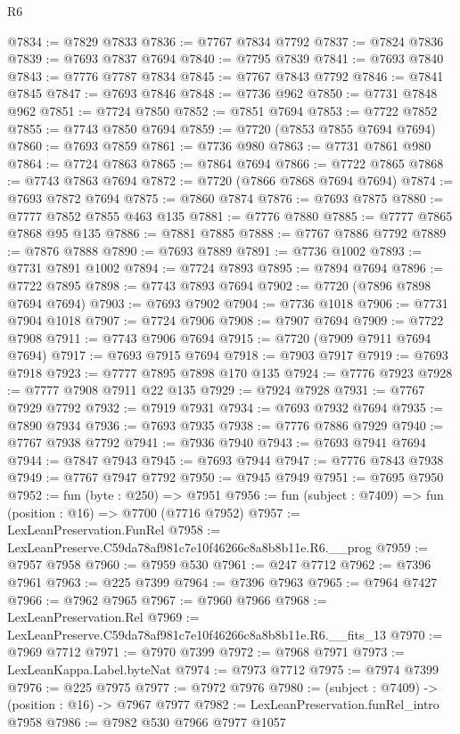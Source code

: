 \begin{lexlean}{R6}
\begin{coremodule}
@7834 := @7829 @7833
@7836 := @7767 @7834 @7792
@7837 := @7824 @7836
@7839 := @7693 @7837 @7694
@7840 := @7795 @7839
@7841 := @7693 @7840
@7843 := @7776 @7787 @7834
@7845 := @7767 @7843 @7792
@7846 := @7841 @7845
@7847 := @7693 @7846
@7848 := @7736 @962
@7850 := @7731 @7848 @962
@7851 := @7724 @7850
@7852 := @7851 @7694
@7853 := @7722 @7852
@7855 := @7743 @7850 @7694
@7859 := @7720 (@7853 @7855 @7694 @7694)
@7860 := @7693 @7859
@7861 := @7736 @980
@7863 := @7731 @7861 @980
@7864 := @7724 @7863
@7865 := @7864 @7694
@7866 := @7722 @7865
@7868 := @7743 @7863 @7694
@7872 := @7720 (@7866 @7868 @7694 @7694)
@7874 := @7693 @7872 @7694
@7875 := @7860 @7874
@7876 := @7693 @7875
@7880 := @7777 @7852 @7855 @463 @135
@7881 := @7776 @7880
@7885 := @7777 @7865 @7868 @95 @135
@7886 := @7881 @7885
@7888 := @7767 @7886 @7792
@7889 := @7876 @7888
@7890 := @7693 @7889
@7891 := @7736 @1002
@7893 := @7731 @7891 @1002
@7894 := @7724 @7893
@7895 := @7894 @7694
@7896 := @7722 @7895
@7898 := @7743 @7893 @7694
@7902 := @7720 (@7896 @7898 @7694 @7694)
@7903 := @7693 @7902
@7904 := @7736 @1018
@7906 := @7731 @7904 @1018
@7907 := @7724 @7906
@7908 := @7907 @7694
@7909 := @7722 @7908
@7911 := @7743 @7906 @7694
@7915 := @7720 (@7909 @7911 @7694 @7694)
@7917 := @7693 @7915 @7694
@7918 := @7903 @7917
@7919 := @7693 @7918
@7923 := @7777 @7895 @7898 @170 @135
@7924 := @7776 @7923
@7928 := @7777 @7908 @7911 @22 @135
@7929 := @7924 @7928
@7931 := @7767 @7929 @7792
@7932 := @7919 @7931
@7934 := @7693 @7932 @7694
@7935 := @7890 @7934
@7936 := @7693 @7935
@7938 := @7776 @7886 @7929
@7940 := @7767 @7938 @7792
@7941 := @7936 @7940
@7943 := @7693 @7941 @7694
@7944 := @7847 @7943
@7945 := @7693 @7944
@7947 := @7776 @7843 @7938
@7949 := @7767 @7947 @7792
@7950 := @7945 @7949
@7951 := @7695 @7950
@7952 := fun (byte : @250) => @7951
@7956 := fun (subject : @7409) => fun (position : @16) => @7700 (@7716 @7952)
@7957 := LexLeanPreservation.FunRel
@7958 := LexLeanPreserve.C59da78af981c7e10f46266c8a8b8b11e.R6.__prog
@7959 := @7957 @7958
@7960 := @7959 @530
@7961 := @247 @7712
@7962 := @7396 @7961
@7963 := @225 @7399
@7964 := @7396 @7963
@7965 := @7964 @7427
@7966 := @7962 @7965
@7967 := @7960 @7966
@7968 := LexLeanPreservation.Rel
@7969 := LexLeanPreserve.C59da78af981c7e10f46266c8a8b8b11e.R6.__fits_13
@7970 := @7969 @7712
@7971 := @7970 @7399
@7972 := @7968 @7971
@7973 := LexLeanKappa.Label.byteNat
@7974 := @7973 @7712
@7975 := @7974 @7399
@7976 := @225 @7975
@7977 := @7972 @7976
@7980 := (subject : @7409) -> (position : @16) -> @7967 @7977
@7982 := LexLeanPreservation.funRel_intro @7958
@7986 := @7982 @530 @7966 @7977 @1057

\end{coremodule}
\end{lexlean}
